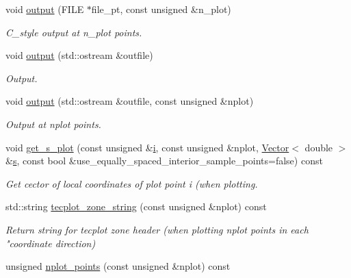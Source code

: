 \begin{DoxyCompactItemize}
void \hyperlink{classoomph_1_1QSpectralElement_3_013_00_01NNODE__1D_01_4_a01295a522815f5dc6c4f26fb8b3257d5}{output} (F\+I\+LE $\ast$file\+\_\+pt, const unsigned \&n\+\_\+plot)
\begin{DoxyCompactList}\small\item\em C\+\_\+style output at n\+\_\+plot points. \end{DoxyCompactList}\item 
void \hyperlink{classoomph_1_1QSpectralElement_3_013_00_01NNODE__1D_01_4_a79244f5a472683a5596cbc109051bca9}{output} (std\+::ostream \&outfile)
\begin{DoxyCompactList}\small\item\em Output. \end{DoxyCompactList}\item 
void \hyperlink{classoomph_1_1QSpectralElement_3_013_00_01NNODE__1D_01_4_a8e7379b83cec5bf5765e6b5e894cb9cf}{output} (std\+::ostream \&outfile, const unsigned \&nplot)
\begin{DoxyCompactList}\small\item\em Output at nplot points. \end{DoxyCompactList}\item 
void \hyperlink{classoomph_1_1QSpectralElement_3_013_00_01NNODE__1D_01_4_a87b3cae6dcb237585734eab89f13bb84}{get\+\_\+s\+\_\+plot} (const unsigned \&\hyperlink{cfortran_8h_adb50e893b86b3e55e751a42eab3cba82}{i}, const unsigned \&nplot, \hyperlink{classoomph_1_1Vector}{Vector}$<$ double $>$ \&\hyperlink{cfortran_8h_ab7123126e4885ef647dd9c6e3807a21c}{s}, const bool \&use\+\_\+equally\+\_\+spaced\+\_\+interior\+\_\+sample\+\_\+points=false) const
\begin{DoxyCompactList}\small\item\em Get cector of local coordinates of plot point i (when plotting. \end{DoxyCompactList}\item 
std\+::string \hyperlink{classoomph_1_1QSpectralElement_3_013_00_01NNODE__1D_01_4_afa93f49624aaeee4160ea0f4bb2cf92f}{tecplot\+\_\+zone\+\_\+string} (const unsigned \&nplot) const
\begin{DoxyCompactList}\small\item\em Return string for tecplot zone header (when plotting nplot points in each "coordinate direction) \end{DoxyCompactList}\item 
unsigned \hyperlink{classoomph_1_1QSpectralElement_3_013_00_01NNODE__1D_01_4_afc859729c1090d442025b866c0fcb781}{nplot\+\_\+points} (const unsigned \&nplot) const

\end{DoxyCompactItemize}
